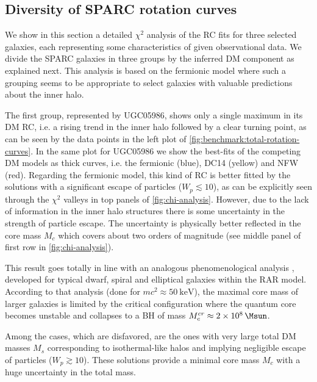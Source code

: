 \subsection[Best-fit analysis]{Diversity of SPARC rotation curves}
\label{sec:fermionic-halos:diversity}


We show in this section a detailed $\chi^2$ analysis of the RC fits for three selected galaxies, each representing some characteristics of given observational data. We divide the SPARC galaxies in three groups by the inferred DM component as explained next. This analysis is based on the fermionic model where such a grouping seems to be appropriate to select galaxies with valuable predictions about the inner halo.

The first group, represented by UGC05986, shows only a single maximum in its DM RC, i.e. a rising trend in the inner halo followed by a clear turning point, as can be seen by the data points in the left plot of \cref{fig:benchmark:total-rotation-curves}. In the same plot for UGC05986 we show the best-fits of the competing DM models as thick curves, i.e. the fermionic (blue), DC14 (yellow) and NFW (red). Regarding the fermionic model, this kind of RC is better fitted by the solutions with a significant escape of particles ($W_p \lesssim 10$), as can be explicitly seen through the $\chi^2$ valleys in top panels of \cref{fig:chi-analysis}. However, due to the lack of information in the inner halo structures there is some uncertainty in the strength of particle escape. The uncertainty is physically better reflected in the core mass $M_c$ which covers about two orders of magnitude (see middle panel of first row in \cref{fig:chi-analysis}).


This result goes totally in line with an analogous phenomenological analysis \citep{2019PDU....24..278A}, developed for typical dwarf, spiral and elliptical galaxies within the RAR model. According to that analysis (done for $mc^2\approx \SI{50}{\kilo\eV}$), the maximal core mass of larger galaxies is limited by the critical configuration where the quantum core becomes unstable and collapses to a BH of mass $M_c^{cr} \approx \SI{2E8}{\Msun}$.

Among the cases, which are disfavored, are the ones with very large total DM masses $M_s$ corresponding to isothermal-like halos and implying negligible escape of particles ($W_p \gtrsim 10$). These solutions provide a minimal core mass $M_c$ with a huge uncertainty in the total mass.

